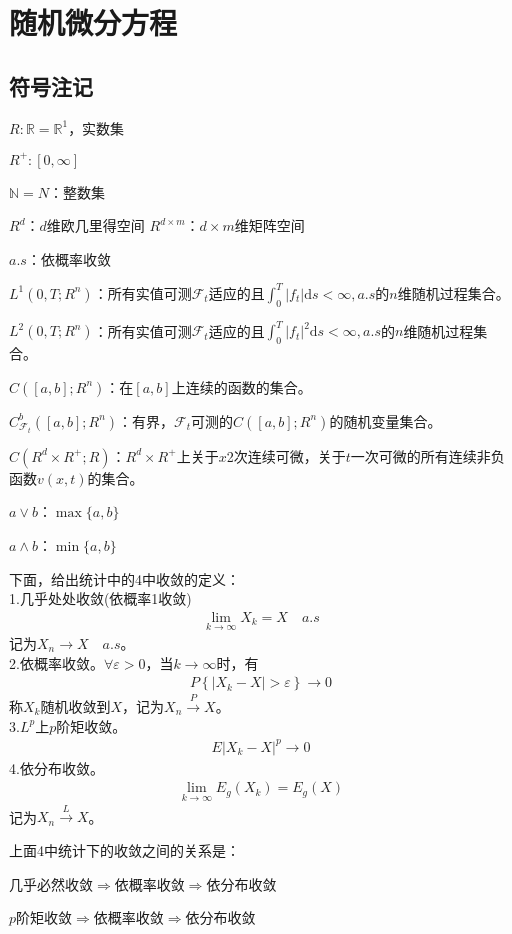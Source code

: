 
\chapter{随机微分方程}
\section{符号注记}
    \par
    $R:\mathbb{R} = \mathbb{R}^1$，实数集
    \par
    $R^+:[0,\infty]$
    \par
    $\mathbb{N} = N$：整数集
    \par
    $R^d$：$d$维欧几里得空间
    $R^{d\times m}$：$d\times m$维矩阵空间
    \par
    $a.s$：依概率收敛
    \par
    $L^1(0,T;R^n)$：所有实值可测$\mathcal{F}_t$适应的且$\int_0^T|f_t|\mathrm{d}s < \infty, a.s$的$n$维随机过程集合。
    \par
    $L^2(0,T;R^n)$：所有实值可测$\mathcal{F}_t$适应的且$\int_0^T|f_t|^2\mathrm{d}s < \infty, a.s$的$n$维随机过程集合。
    \par
    $C([a,b];R^n)$：在$[a,b]$上连续的函数的集合。
    \par
    $C_{\mathcal{F}_t}^b([a,b];R^n)$：有界，$\mathcal{F}_t$可测的$C([a,b];R^n)$的随机变量集合。
    \par
    $C(R^d\times R^+;R)$：$R^d\times R^+$上关于$x$2次连续可微，关于$t$一次可微的所有连续非负函数$v(x,t)$的集合。
    \par
    $a \vee b$：$\max\{a,b\}$
    \par
    $a\wedge b$：$\min\{a,b\}$
    \par
    下面，给出统计中的4中收敛的定义：\\
    1.几乎处处收敛(依概率1收敛)
    \begin{align*}
        \lim_{k \rightarrow \infty} X_k = X \quad a.s
    \end{align*}
    记为$X_n \rightarrow X \quad a.s$。\\
    2.依概率收敛。$\forall \varepsilon > 0$，当$k\rightarrow \infty$时，有
    \begin{align*}
        P\left\{ |X_k - X|  > \varepsilon\right\} \rightarrow 0
    \end{align*}
    称$X_k$随机收敛到$X$，记为$X_n \xrightarrow{P}X$。\\
    3.$L^p$上$p$阶矩收敛。
    \begin{align*}
        E|X_k - X|^p \rightarrow 0
    \end{align*}
    4.依分布收敛。
    \begin{align*}
    \lim_{k\rightarrow \infty} E_g(X_k) = E_g(X)
    \end{align*}
    记为$X_n\xrightarrow{L}X$。
    \par
    上面4中统计下的收敛之间的关系是：
    \par
    几乎必然收敛$\Rightarrow$依概率收敛$\Rightarrow$依分布收敛
    \par
    $p$阶矩收敛$\Rightarrow$依概率收敛$\Rightarrow$依分布收敛
